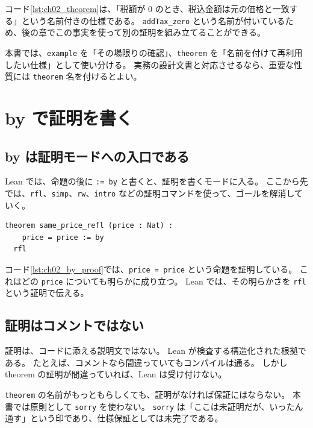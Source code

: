 コード\ref{lst:ch02_theorem}は、「税額が 0 のとき、税込金額は元の価格と一致する」という名前付きの仕様である。
\texttt{addTax\_zero} という名前が付いているため、後の章でこの事実を使って別の証明を組み立てることができる。

\begin{definitionbox}
本書では、\texttt{example} を「その場限りの確認」、\texttt{theorem} を「名前を付けて再利用したい仕様」として使い分ける。
実務の設計文書と対応させるなら、重要な性質には \texttt{theorem} 名を付けるとよい。
\end{definitionbox}

\section{by で証明を書く}

\subsection{by は証明モードへの入口である}

Lean では、命題の後に \texttt{:= by} と書くと、証明を書くモードに入る。
ここから先では、\texttt{rfl}、\texttt{simp}、\texttt{rw}、\texttt{intro} などの証明コマンドを使って、ゴールを解消していく。

\begin{listing}[htbp]
\begin{verbatim}
theorem same_price_refl (price : Nat) :
    price = price := by
  rfl
\end{verbatim}
\caption{by ブロックの基本形}
\label{lst:ch02_by_proof}
\end{listing}

コード\ref{lst:ch02_by_proof}では、\texttt{price = price} という命題を証明している。
これはどの \texttt{price} についても明らかに成り立つ。
Lean では、その明らかさを \texttt{rfl} という証明で伝える。

\subsection{証明はコメントではない}

証明は、コードに添える説明文ではない。
Lean が検査する構造化された根拠である。
たとえば、コメントなら間違っていてもコンパイルは通る。
しかし theorem の証明が間違っていれば、Lean は受け付けない。

\begin{warningbox}
\texttt{theorem} の名前がもっともらしくても、証明がなければ保証にはならない。
本書では原則として \texttt{sorry} を使わない。
\texttt{sorry} は「ここは未証明だが、いったん通す」という印であり、仕様保証としては未完了である。
\end{warningbox}

